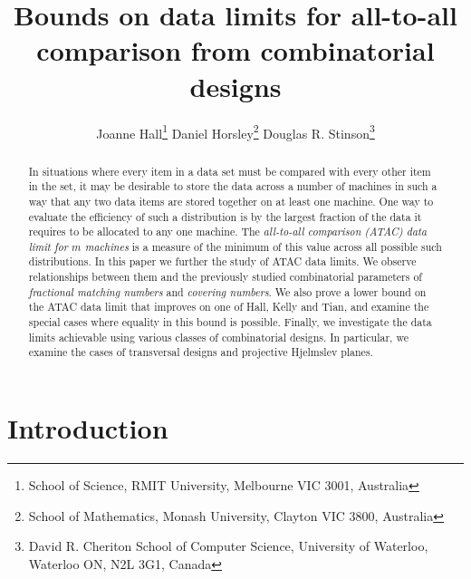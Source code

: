 \documentclass[11pt]{article}
\title{Bounds on data limits for all-to-all comparison from combinatorial designs}
\author{Joanne Hall\thanks{School of Science, RMIT University, Melbourne VIC 3001, Australia} \qquad Daniel Horsley\thanks{School of Mathematics, Monash University, Clayton VIC 3800, Australia} \qquad Douglas R. Stinson\thanks{David R. Cheriton School of Computer Science, University of Waterloo, Waterloo ON, N2L 3G1, Canada}}
\date{}
\theoremstyle{definition}
\begin{document}
\maketitle

\begin{abstract}
In situations where every item in a data set must be compared with every other item in the set, it may be desirable to store the data across a number of machines in such a way that any two data items are stored together on at least one machine. One way to evaluate the efficiency of such a distribution is by the largest fraction of the data it requires to be allocated to any one machine. The \emph{all-to-all comparison (ATAC) data limit for $m$ machines} is a measure of the minimum of this value across all possible such distributions. In this paper we further the study of ATAC data limits. We observe relationships between them and the previously studied combinatorial parameters of \emph{fractional matching numbers} and \emph{covering numbers}. We also prove a lower bound on the ATAC data limit that improves on one of Hall, Kelly and Tian, and examine the special cases where equality in this bound is possible. Finally, we investigate the data limits achievable using various classes of combinatorial designs. In particular, we examine the cases of transversal designs and projective Hjelmslev planes.
\end{abstract}

\section{Introduction}
\end{document}
